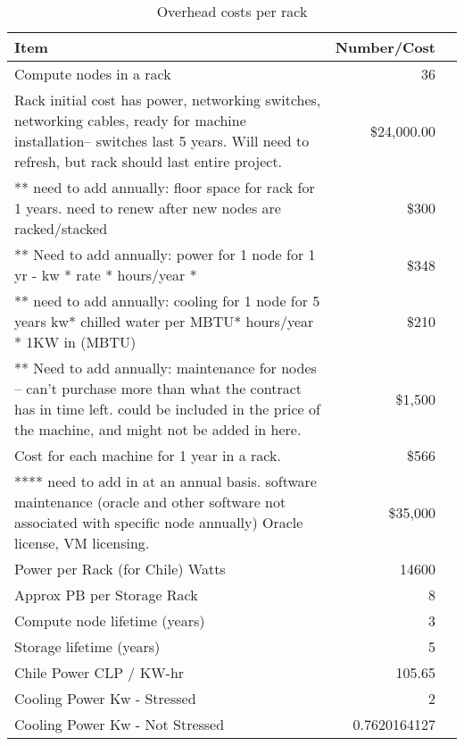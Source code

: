 \tiny \begin{longtable} { |p{}  |r  |r |} 
\caption{Overhead costs per rack \label{tab:overheads}}\\ 
\hline 
\textbf{Item}&\textbf{Number/Cost} \\ \hline
{Compute nodes in a rack }&{36} \\ \hline
{Rack initial cost has power, networking switches, networking cables, ready for machine installation-- switches last 5 years.  Will need to refresh, but rack should last entire project.  }&{\$24,000.00} \\ \hline
{ ** need to add annually: floor space for rack for 1 years.   need to renew after new nodes are racked/stacked }&{\$300} \\ \hline
{** Need to add annually: power for 1 node for 1 yr - kw * rate * hours/year * }&{\$348} \\ \hline
{** need to add annually: cooling for 1 node for 5 years  kw* chilled water per MBTU* hours/year *  1KW in (MBTU) }&{\$210} \\ \hline
{** Need to add annually: maintenance for nodes -- can't purchase more than what the contract has in time left.  could be included in the price of the machine, and might not be added in here.  }&{\$1,500} \\ \hline
{Cost for each machine for 1 year in a rack.   }&{\$566} \\ \hline
{**** need to add in at an annual basis.  software maintenance (oracle and other software not associated with specific node annually)  Oracle license, VM licensing.  }&{\$35,000} \\ \hline
{Power per Rack (for Chile) Watts}&{14600} \\ \hline
{Approx PB per Storage Rack }&{8} \\ \hline
{Compute node lifetime (years)}&{3} \\ \hline
{Storage lifetime (years)}&{5} \\ \hline
{Chile Power CLP / KW-hr
}&{105.65} \\ \hline
{Cooling Power Kw - Stressed}&{2} \\ \hline
{Cooling Power Kw - Not Stressed}&{0.7620164127} \\ \hline
\end{longtable} \normalsize

